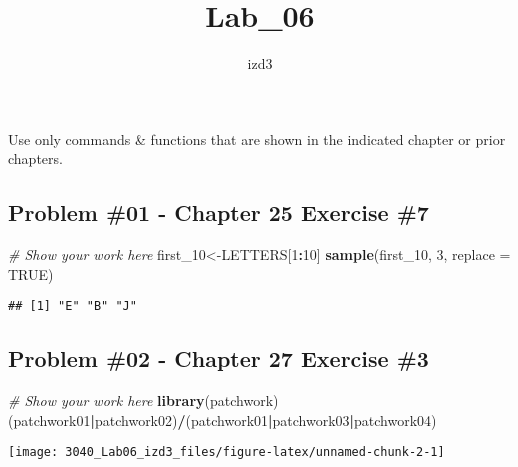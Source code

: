 \documentclass[
]{article}
\title{Lab\_06}
\author{izd3}
\date{}
\newenvironment{Shaded}{\begin{snugshade}}{\end{snugshade}}
\newcommand{\AttributeTok}[1]{\textcolor[rgb]{0.13,0.29,0.53}{#1}}
\newcommand{\CommentTok}[1]{\textcolor[rgb]{0.56,0.35,0.01}{\textit{#1}}}
\newcommand{\ConstantTok}[1]{\textcolor[rgb]{0.56,0.35,0.01}{#1}}
\newcommand{\DecValTok}[1]{\textcolor[rgb]{0.00,0.00,0.81}{#1}}
\newcommand{\FunctionTok}[1]{\textcolor[rgb]{0.13,0.29,0.53}{\textbf{#1}}}
\newcommand{\NormalTok}[1]{#1}
\newcommand{\OtherTok}[1]{\textcolor[rgb]{0.56,0.35,0.01}{#1}}
\newcommand{\SpecialCharTok}[1]{\textcolor[rgb]{0.81,0.36,0.00}{\textbf{#1}}}
\newcommand{\StringTok}[1]{\textcolor[rgb]{0.31,0.60,0.02}{#1}}
\begin{document}
\maketitle

Use only commands \& functions that are shown in the indicated chapter
or prior chapters.

\newpage

\hypertarget{problem-01---chapter-25-exercise-7}{%
\subsection{Problem \#01 - Chapter 25 Exercise
\#7}\label{problem-01---chapter-25-exercise-7}}

\begin{Shaded}
\begin{Highlighting}[]
\CommentTok{\# Show your work here}
\NormalTok{first\_10}\OtherTok{\textless{}{-}}\NormalTok{LETTERS[}\DecValTok{1}\SpecialCharTok{:}\DecValTok{10}\NormalTok{]}
\FunctionTok{sample}\NormalTok{(first\_10, }\DecValTok{3}\NormalTok{, }\AttributeTok{replace =} \ConstantTok{TRUE}\NormalTok{)}
\end{Highlighting}
\end{Shaded}

\begin{verbatim}
## [1] "E" "B" "J"
\end{verbatim}

\newpage

\hypertarget{problem-02---chapter-27-exercise-3}{%
\subsection{Problem \#02 - Chapter 27 Exercise
\#3}\label{problem-02---chapter-27-exercise-3}}

\begin{Shaded}
\begin{Highlighting}[]
\CommentTok{\# Show your work here}
\FunctionTok{library}\NormalTok{(}\StringTok{\textquotesingle{}patchwork\textquotesingle{}}\NormalTok{)}
\NormalTok{(patchwork01}\SpecialCharTok{|}\NormalTok{patchwork02)}\SpecialCharTok{/}\NormalTok{(patchwork01}\SpecialCharTok{|}\NormalTok{patchwork03}\SpecialCharTok{|}\NormalTok{patchwork04)}
\end{Highlighting}
\end{Shaded}

\texttt{[image: 3040\_Lab06\_izd3\_files/figure-latex/unnamed-chunk-2-1]}

\newpage
\end{document}
